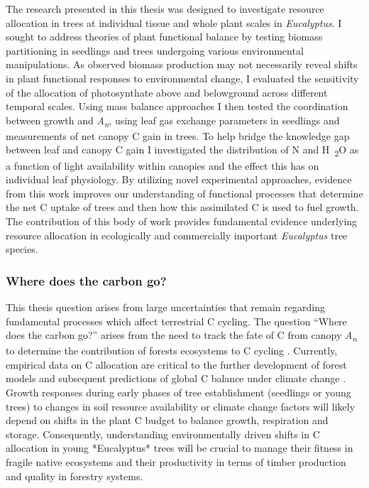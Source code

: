 \documentclass[a4paper]{article}
\begin{document}
The research presented in this thesis was designed to investigate resource allocation in trees at individual tissue and whole plant scales in \textit{Eucalyptus}. I sought to address theories of plant functional balance by testing biomass partitioning in seedlings and trees undergoing various environmental manipulations. As observed biomass production may not necessarily reveal shifts in plant functional responses to environmental change, I evaluated the sensitivity of the allocation of photosynthate above and belowground across different temporal scales. Using mass balance approaches I then tested the coordination between growth and \textit{A\textsubscript{n}}, using leaf gas exchange parameters in seedlings and measurements of net canopy C gain in trees. To help bridge the knowledge gap between leaf and canopy C gain I investigated the distribution of N and H~\textsubscript{2}O as a function of light availability within canopies and the effect this has on individual leaf physiology. By utilizing novel experimental approaches, evidence from this work improves our understanding of functional processes that determine the net C uptake of trees and then how this assimilated C is used to fuel growth. The contribution of this body of work provides fundamental evidence underlying resource allocation in ecologically and commercially important \textit{Eucalyptus} tree species.

\subsubsection*{Where does the carbon go?}
This thesis question arises from large uncertainties that remain regarding fundamental processes which affect terrestrial C cycling.  The question “Where does the carbon go?” arises from the need to track the fate of C from canopy \textit{A\textsubscript{n}} to determine the contribution of forests ecosystems to C cycling \citep{litton2007carbon}. Currently, empirical data on C allocation are critical to the further development of forest models and subsequent predictions of global C balance under climate change \citep{franklin2012modeling}. Growth responses during early phases of tree establishment (seedlings or young trees) to changes in soil resource availability or climate change factors will likely depend on shifts in the plant C budget to balance growth, respiration and storage. Consequently, understanding environmentally driven shifts in C allocation in young *Eucalyptus* trees will be crucial to manage their fitness in fragile native ecosystems and their productivity in terms of timber production and quality in forestry systems.
\end{document}
